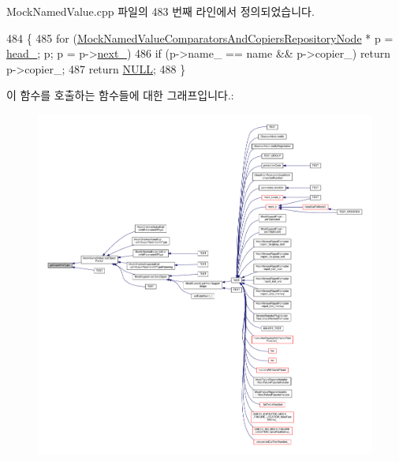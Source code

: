 Mock\+Named\+Value.\+cpp 파일의 483 번째 라인에서 정의되었습니다.


\begin{DoxyCode}
484 \{
485     \textcolor{keywordflow}{for} (\hyperlink{struct_mock_named_value_comparators_and_copiers_repository_node}{MockNamedValueComparatorsAndCopiersRepositoryNode}
      * p = \hyperlink{class_mock_named_value_comparators_and_copiers_repository_a9b7330472fa269c68e74f4f37384fcf3}{head\_}; p; p = p->\hyperlink{struct_mock_named_value_comparators_and_copiers_repository_node_a2764dc799ce6105dd7b5a74a0aae8f6e}{next\_})
486             \textcolor{keywordflow}{if} (p->name\_ == name && p->copier\_) \textcolor{keywordflow}{return} p->copier\_;
487     \textcolor{keywordflow}{return} \hyperlink{openavb__types__base__pub_8h_a070d2ce7b6bb7e5c05602aa8c308d0c4}{NULL};
488 \}
\end{DoxyCode}


이 함수를 호출하는 함수들에 대한 그래프입니다.\+:
\nopagebreak
\begin{figure}[H]
\begin{center}
\leavevmode
\includegraphics[width=350pt]{class_mock_named_value_comparators_and_copiers_repository_a39b6e1f8952e28ad6d4779e40b4f0b0d_icgraph}
\end{center}
\end{figure}


